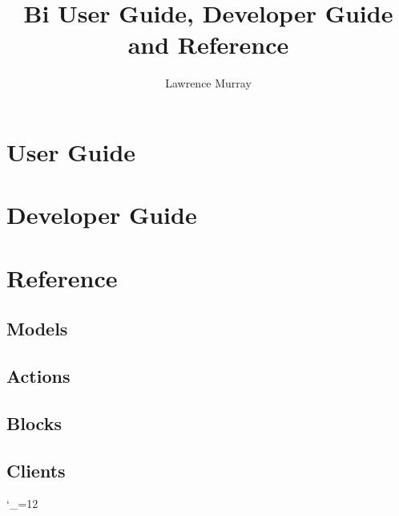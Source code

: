 \documentclass[a4paper,11pt,times]{report}
\title{\Huge{Bi User Guide, Developer Guide and Reference}}
\author{Lawrence Murray}
\begin{document}
\maketitle

\tableofcontents

\chapter{User Guide\label{User_Guide}}



\chapter{Developer Guide\label{Developer_Guide}}



\chapter{Reference\label{Reference}}

\section{Models}


\section{Actions}


\section{Blocks}


\section{Clients}



\begingroup \catcode`_=12 %
\printindex
\endgroup
\end{document}
